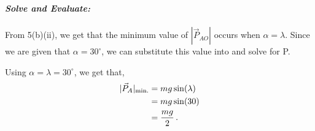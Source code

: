 \begin{subquestions}
\begin{subsubquestions}
	
	\subsubquestion
	
	\textbf{\textit{Solve and Evaluate:}} \\ \\
	From 5(b)(ii), we get that the minimum value of $|\vec{P}_{AO}|$ occurs when $\alpha=\lambda$. Since we are given that $\alpha=30^\circ$, we can substitute this value into  and solve for P.
	
	Using $\alpha=\lambda=30^\circ$, we get that,
	\begin{align}
		|\vec{P}_{A}|_{\text{min.}} & = mg\sin(\lambda) \nonumber \\
		& = mg\sin(30) \nonumber \\
		& = \frac{mg}{2} \,.
	\end{align}
	
\end{subsubquestions}

\end{subquestions}